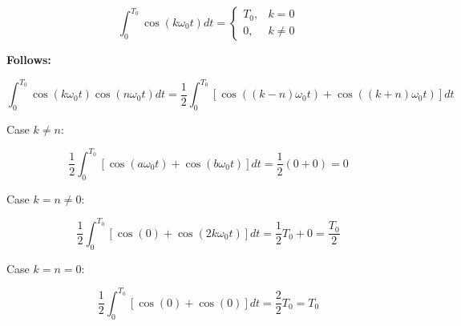 \begin{equation}
	\int_0^{T_0} \cos(k \omega_0 t) dt =
	\begin{cases}
		T_0,& k=0\\
		0,& k \neq 0
	\end{cases}
\end{equation}

\textbf{Follows:}

\[
	\int_0^{T_0} \cos(k \omega_0 t) \cos(n \omega_0 t) dt 
	= \frac{1}{2} \int_0^{T_0} \left[ \cos\left((k-n)\omega_0 t\right) + \cos\left((k+n)\omega_0 t\right)\right] dt
\]


Case $k \neq n$:

\[
	\frac{1}{2} \int_0^{T_0} \left[ \cos\left(a \omega_0 t\right) + \cos\left(b \omega_0 t\right)\right] dt
	= \frac{1}{2} (0 + 0)
	= 0
\]

Case $k = n \neq 0$:

\[
	\frac{1}{2} \int_0^{T_0} \left[ \cos\left(0\right) + \cos\left(2k\omega_0 t\right)\right] dt
	= \frac{1}{2} T_0 + 0
	= \frac{T_0}{2}
\]

Case $k = n = 0$:

\[
	\frac{1}{2} \int_0^{T_0} \left[ \cos\left(0\right) + \cos\left(0\right)\right] dt
	= \frac{2}{2} T_0
	= T_0
\]

